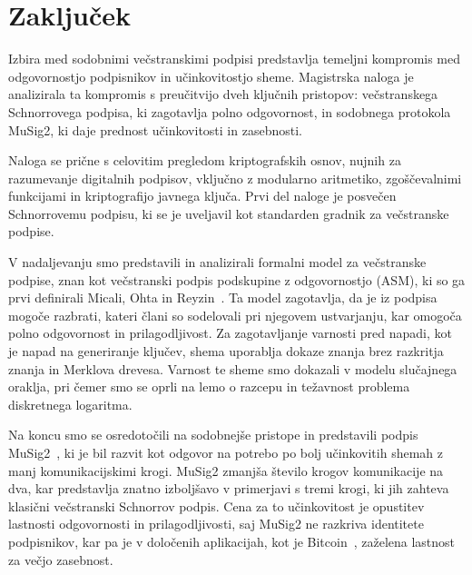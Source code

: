 \section{Zaključek}
Izbira med sodobnimi večstranskimi podpisi predstavlja temeljni kompromis med odgovornostjo podpisnikov
in učinkovitostjo sheme. Magistrska naloga je analizirala ta kompromis s preučitvijo dveh ključnih
pristopov: večstranskega Schnorrovega podpisa, ki zagotavlja polno odgovornost, in sodobnega protokola
MuSig2, ki daje prednost učinkovitosti in zasebnosti.

Naloga se prične s celovitim pregledom kriptografskih osnov, nujnih za razumevanje digitalnih podpisov,
vključno z modularno aritmetiko, zgoščevalnimi funkcijami in kriptografijo javnega ključa. Prvi del
naloge je posvečen Schnorrovemu podpisu, ki se je uveljavil kot standarden gradnik za večstranske
podpise.

V nadaljevanju smo predstavili in analizirali formalni model za večstranske podpise, znan kot večstranski
podpis podskupine z odgovornostjo (ASM), ki so ga prvi definirali Micali, Ohta in Reyzin~\cite{micali2001asm}.
Ta model zagotavlja, da je iz podpisa mogoče razbrati, kateri člani so sodelovali pri njegovem
ustvarjanju, kar omogoča polno odgovornost in prilagodljivost. Za zagotavljanje varnosti pred napadi,
kot je napad na generiranje ključev, shema uporablja dokaze znanja brez razkritja znanja in Merklova
drevesa. Varnost te sheme smo dokazali v modelu slučajnega oraklja, pri čemer smo se oprli na lemo o
razcepu in težavnost problema diskretnega logaritma.

Na koncu smo se osredotočili na sodobnejše pristope in predstavili podpis MuSig2~\cite{jonas2020musig2},
ki je bil razvit kot odgovor na potrebo po bolj učinkovitih shemah z manj komunikacijskimi krogi.
MuSig2 zmanjša število krogov komunikacije na dva, kar predstavlja znatno izboljšavo v primerjavi s
tremi krogi, ki jih zahteva klasični večstranski Schnorrov podpis. Cena za to učinkovitost je opustitev
lastnosti odgovornosti in prilagodljivosti, saj MuSig2 ne razkriva identitete podpisnikov, kar pa je
v določenih aplikacijah, kot je Bitcoin~\cite{nakamoto2009bitcoin}, zaželena lastnost za večjo zasebnost.

